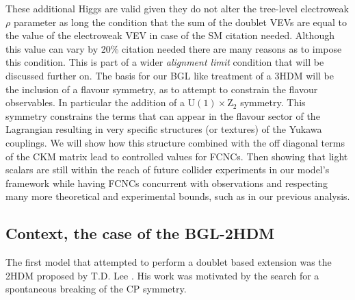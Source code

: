 These additional Higgs are valid given they do not alter the tree-level electroweak $\rho$ parameter as long the condition that the sum of the doublet VEVs are equal to the value of the electroweak VEV in case of the SM {\color{blue} citation needed}. 
% 
Although this value can vary by 20\% { \color{blue} citation needed} there are many reasons as to impose this condition.
%
This is part of a wider \textit{alignment limit} condition that will be discussed further on. 
%
The basis for our BGL like treatment of a 3HDM will be the inclusion of a flavour symmetry, as to attempt to constrain the flavour observables. In particular the addition of a $\mathrm{U}(1) \times \mathrm{Z}_2$ symmetry.
% 
This symmetry constrains the terms that can appear in the flavour sector of the Lagrangian resulting in very specific structures (or textures) of the Yukawa couplings.
% 
We will show how this structure combined with the off diagonal terms of the CKM matrix lead to controlled values for FCNCs. 
%
%
Then showing that light scalars are still within the reach of future collider experiments in our model's framework while having FCNCs concurrent with observations and respecting many more theoretical and experimental bounds, such as in our previous analysis. 


\subsection{Context, the case of the BGL-2HDM}

The first model that attempted to perform a doublet based extension was the 2HDM proposed by T.D. Lee \cite{Lee1973}.  
%
His work was motivated by the search for a spontaneous breaking of the CP symmetry. 

